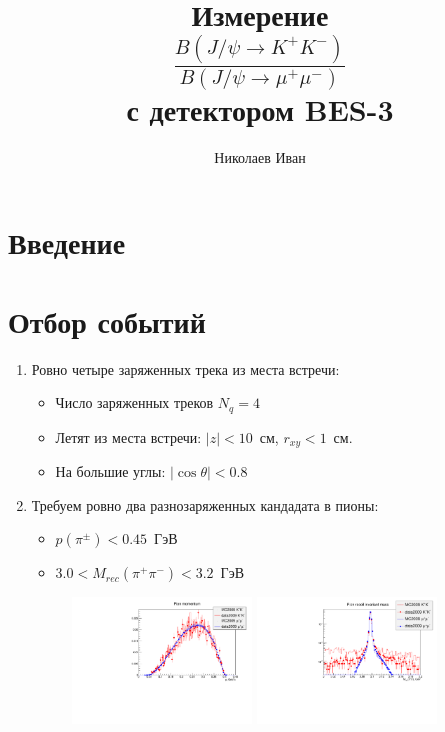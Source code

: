 \documentclass[unicode]{beamer}
\title{
	Измерение \vspace{1ex} \\
	$ \frac{B(J/\psi \to K^+K^-)}{B(J/\psi \to \mu^+\mu^-)}$ \\
\vspace{1ex}
с детектором BES-3}
\author{Николаев Иван}
\institute[ИЯФ СО РАН]
{ 
}
\newcommand{\pipi}{\pi^{+}\pi^{-}}
\begin{document}
\begin{frame}
  \maketitle
\end{frame}

\section{Введение}
\begin{frame}
\end{frame}
\section{Отбор событий}
\begin{frame}
\begin{enumerate}
	\item Ровно четыре заряженных трека из места встречи:
		\begin{itemize}
			\item Число заряженных треков $N_q = 4$
			\item Летят из места встречи: $|z| <  10$~см,  $r_{xy} < 1$~см. 
			\item На большие углы: $|\cos{\theta}|<0.8$
	  \end{itemize}

	\item Требуем ровно два разнозаряженных кандадата в пионы:
		\begin{itemize}
			\item $p(\pi^\pm) < 0.45$~ГэВ
			\item $3.0 < M_{rec}(\pipi)< 3.2$~ГэВ
		\end{itemize}

			\begin{figure}
			\begin{center}
			 \includegraphics[width=0.45\textwidth]{fig/pion_momentum.pdf} \hfill
			 \includegraphics[width=0.45\textwidth]{fig/pion_Mrec.pdf}
			\end{center}
			\end{figure}
		\end{enumerate}
\end{frame}
\end{document}
